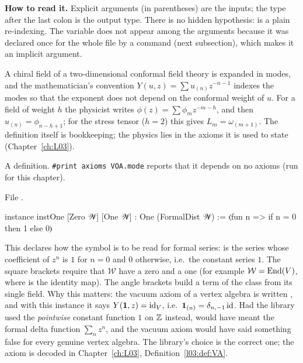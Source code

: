 \begin{dictionary}
\textbf{How to read it.} Explicit arguments (in parentheses) are the inputs; the type after the last
colon is the output type. There is no hidden hypothesis:  is a plain re-indexing. The
variable  does not appear among the arguments because it was declared once for the whole
file by a  command (next subsection), which makes it an implicit argument.
\end{dictionary}

\begin{physics}
A chiral field of a two-dimensional conformal field theory is expanded in modes, and the
mathematician's convention $Y(u,z) = \sum u_{(n)}z^{-n-1}$ indexes the modes so that the exponent
does not depend on the conformal weight of $u$. For a field of weight $h$ the physicist writes
$\phi(z) = \sum\phi_m z^{-m-h}$, and then $u_{(n)} = \phi_{n-h+1}$; for the stress tensor ($h=2$)
this gives $L_m = \omega_{(m+1)}$. The definition itself is bookkeeping; the physics lies in the
axioms it is used to state (Chapter~\ref{ch:L03}).
\end{physics}

\begin{status}
A definition. \texttt{\#print axioms VOA.mode} reports that it depends on no axioms (run for this
chapter).
\end{status}

\begin{example}\label{ch01:ex:instOne}
\noindent File .
\begin{leancode}
instance instOne [Zero 𝒲] [One 𝒲] : One (FormalDist 𝒲) := ⟨fun n => if n = 0 then 1 else 0⟩
\end{leancode}
This declares how the symbol  is to be read for formal series:  is the series whose
coefficient of $z^n$ is $1$ for $n=0$ and $0$ otherwise, i.e.\ the constant series $1$. The square
brackets \lean{[Zero 𝒲] [One 𝒲]} require that $\mathcal W$ have a zero and a one (for example
$\mathcal W = \operatorname{End}(V)$, where  is the identity map). The angle brackets
 build a term of the class  from its single field. Why this matters: the vacuum
axiom of a vertex algebra is written , and with this instance it says
$Y(\mathbf{1},z) = \mathrm{id}_V$, i.e.\ $\mathbf{1}_{(n)} = \delta_{n,-1}\,\mathrm{id}$. Had the
library used the \emph{pointwise} constant function $1$ on ${\mathbb{Z}}$ instead,  would have meant
the formal delta function $\sum_n z^n$, and the vacuum axiom would have said something false for
every genuine vertex algebra. The library's choice is the correct one; the axiom is decoded in
Chapter~\ref{ch:L03}, Definition~\ref{l03:def:VA}.
\end{example}

